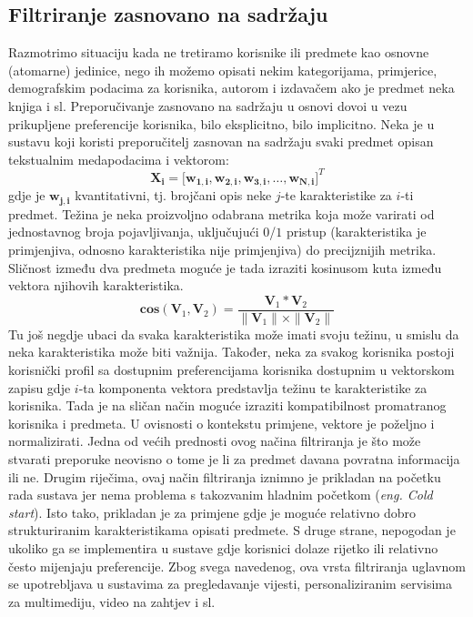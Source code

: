 \documentclass[times, utf8, diplomski, numeric]{fer}
\begin{document}
\subsection{Filtriranje zasnovano na sadržaju}
Razmotrimo situaciju kada ne tretiramo korisnike ili predmete kao osnovne
(atomarne) jedinice, nego ih možemo opisati nekim kategorijama, primjerice,
demografskim podacima za korisnika, autorom i izdavačem ako je predmet neka
knjiga i sl. Preporučivanje zasnovano na sadržaju u osnovi dovoi u vezu
prikupljene preferencije korisnika, bilo eksplicitno, bilo implicitno. Neka je u
sustavu koji koristi preporučitelj zasnovan na sadržaju svaki predmet opisan
tekstualnim medapodacima i vektorom:
\begin{equation}
\label{eq:vektorKarakteristika}
	\boldsymbol{X_i} = 
		\big[ 
			\boldsymbol{w_{1,i}}, 
			\boldsymbol{w_{2,i}}, 
			\boldsymbol{w_{3,i}}, 
			\ldots, 
			\boldsymbol{w_{N,i}} 
		\big]^T
\end{equation}
gdje je $\boldsymbol{w_{j,i}}$ kvantitativni, tj. brojčani opis neke $j$-te
karakteristike za $i$-ti predmet. Težina je neka proizvoljno odabrana metrika
koja može varirati od jednostavnog broja pojavljivanja, uključujući $0$/$1$
pristup (karakteristika je primjenjiva, odnosno karakteristika nije
primjenjiva) do precijznijih metrika. Sličnost između dva predmeta moguće je
tada izraziti kosinusom kuta između vektora njihovih karakteristika. 
\begin{equation}
\label{eq:kosinus}
	\boldsymbol{cos}(\boldsymbol{V}_1, \boldsymbol{V}_2) = 
		\frac
			{\boldsymbol{V}_1 \ast \boldsymbol{V}_2}
			{\|\boldsymbol{V}_1\| \times \|\boldsymbol{V}_2\|}
\end{equation}
Tu još negdje ubaci da svaka karakteristika može imati svoju težinu, u smislu da
neka karakteristika može biti važnija.
Također, neka za svakog korisnika postoji korisnički profil sa dostupnim
preferencijama korisnika dostupnim u vektorskom zapisu gdje $i$-ta komponenta
vektora predstavlja težinu te karakteristike za korisnika. Tada je na sličan
način moguće izraziti kompatibilnost promatranog korisnika i predmeta. U
ovisnosti o kontekstu primjene, vektore je poželjno i normalizirati.
Jedna od većih prednosti ovog načina filtriranja je što može stvarati preporuke
neovisno o tome je li za predmet davana povratna informacija ili ne. Drugim
riječima, ovaj način filtriranja iznimno je prikladan na početku rada sustava
jer nema problema s takozvanim hladnim početkom (\emph{eng. Cold start}). Isto
tako, prikladan je za primjene gdje je moguće relativno dobro strukturiranim
karakteristikama opisati predmete. S druge strane, nepogodan je ukoliko ga
se implementira u sustave gdje korisnici dolaze rijetko ili relativno često
mijenjaju preferencije. Zbog svega navedenog, ova vrsta filtriranja uglavnom se
upotrebljava u sustavima za pregledavanje vijesti, personaliziranim servisima za
multimediju, video na zahtjev i sl.
\end{document}
